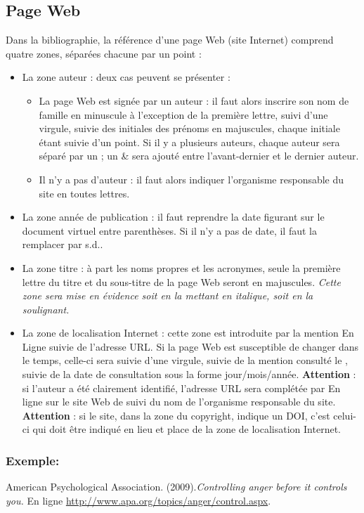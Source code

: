 \documentclass[a4paper,titlepage]{article}
\begin{document}
	\subsection*{Page Web}
Dans la bibliographie, la référence d’une page Web
(site Internet) comprend
quatre zones, séparées chacune par un point :
 \begin{itemize}
  \item La zone auteur : deux cas peuvent se présenter :
  \begin{itemize}
  	\item La page Web est signée par un auteur : il faut alors inscrire son nom de famille en minuscule à l’exception de la première lettre, suivi d’une virgule, suivie des initiales des prénoms en majuscules, chaque initiale étant suivie d’un point. Si il y a plusieurs auteurs, chaque auteur sera séparé par un ; un \& sera ajouté entre l’avant-dernier et le dernier auteur.
  	\item Il n’y a pas d’auteur : il faut alors indiquer l’organisme responsable du site en toutes lettres. 
  \end{itemize}
  \item La zone année de publication : il faut reprendre la date figurant sur le document virtuel entre parenthèses. Si il n’y a pas de date, il faut la remplacer par \og s.d.\fg{}. 
  \item La zone titre : à part les noms propres et les acronymes, seule la première lettre du titre et du sous-titre de la page Web seront en majuscules. \textit{Cette zone sera mise en évidence soit en la mettant en italique, soit en la soulignant.}
  \item La zone de localisation Internet : cette zone est introduite par la mention \og En Ligne \fg{}  suivie de l’adresse URL. Si la page Web est susceptible de changer dans le temps, celle-ci sera suivie d’une virgule, suivie de la mention \og consulté le \fg{}, suivie de la date de consultation sous la forme jour/mois/année. \textbf{Attention} : si l’auteur a été clairement identifié, l’adresse URL sera complétée par \og En ligne sur le site Web de \fg{} suivi du nom de l’organisme responsable du site. \textbf{Attention} : si le site, dans la zone du copyright, indique un DOI, c’est celui-ci qui doit être indiqué en lieu et place de la zone de localisation Internet. 
 \end{itemize}
 
\subsubsection*{Exemple:}
	American Psychological Association. (2009).\textit{Controlling anger before it controls you.} En ligne \url{http://www.apa.org/topics/anger/control.aspx}.\\
	
\end{document}
